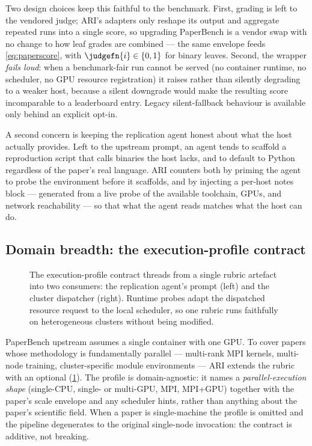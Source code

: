 Two design choices keep this faithful to the benchmark. First, grading
is left to the vendored judge; ARI's adapters only reshape its output
and aggregate repeated runs into a single score, so upgrading
PaperBench is a vendor swap with no change to how leaf grades are
combined --- the same envelope feeds \cref{eq:paperscore}, with
$\judgefn{i}\in\{0,1\}$ for binary leaves. Second, the wrapper
\emph{fails loud}: when a benchmark-fair run cannot be served (no
container runtime, no scheduler, no GPU resource registration) it
raises rather than silently degrading to a weaker host, because a
silent downgrade would make the resulting score incomparable to a
leaderboard entry. Legacy silent-fallback behaviour is available only
behind an explicit opt-in.

A second concern is keeping the replication agent honest about what
the host actually provides. Left to the upstream prompt, an agent
tends to scaffold a reproduction script that calls binaries the host
lacks, and to default to Python regardless of the paper's real
language. ARI counters both by priming the agent to probe the
environment before it scaffolds, and by injecting a per-host notes
block --- generated from a live probe of the available toolchain, GPUs,
and network reachability --- so that what the agent reads matches what
the host can do.

\subsection{Domain breadth: the execution-profile contract}\label{sec:paper:paperbench:v072}

\begin{figure}[t]
  \centering
  \resizebox{\columnwidth}{!}{}
  \caption{The execution-profile contract threads from a single rubric
           artefact into two consumers: the replication agent's prompt
           (left) and the cluster dispatcher (right). Runtime probes
           adapt the dispatched resource request to the local scheduler,
           so one rubric runs faithfully on heterogeneous clusters
           without being modified.}
  \label{fig:execution-profile}
\end{figure}

PaperBench upstream assumes a single container with one GPU. To cover
papers whose methodology is fundamentally parallel --- multi-rank MPI
kernels, multi-node training, cluster-specific module environments ---
ARI extends the rubric with an optional 
(\cref{fig:execution-profile}). The profile is domain-agnostic: it
names a \emph{parallel-execution shape} (single-CPU, single- or
multi-GPU, MPI, MPI+GPU) together with the paper's scale envelope and
any scheduler hints, rather than anything about the paper's scientific
field. When a paper is single-machine the profile is omitted and the
pipeline degenerates to the original single-node invocation: the
contract is additive, not breaking.

